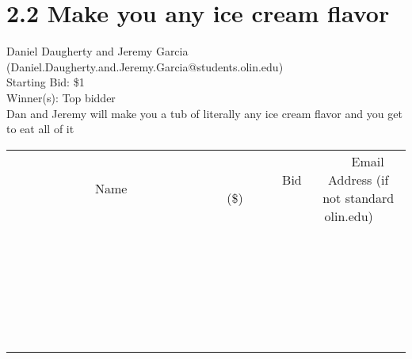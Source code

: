 \documentclass[11pt]{article}
\begin{document}
\section*{2.2 Make you any ice cream flavor}
Daniel Daugherty and Jeremy Garcia (Daniel.Daugherty.and.Jeremy.Garcia@students.olin.edu) \\
Starting Bid: \$1 \\
Winner(s): 
Top bidder \\
Dan and Jeremy will make you a tub of literally any ice cream flavor and you get to eat all of it \\[6ex]
\begin{tabular}{c c c}
~~~~~~~~~~~~~Name~~~~~~~~~~~~~ & ~~~~~~~~~Bid (\$)~~~~~~~~~ & ~~~Email Address (if not standard olin.edu)~~~ \\
 & & \\
\hline
 & & \\
\hline
 & & \\
\hline
 & & \\
\hline
 & & \\
\hline
 & & \\
\hline
 & & \\
\hline
 & & \\
\hline
 & & \\
\hline
 & & \\
\hline
 & & \\
\hline
 & & \\
\hline
 & & \\
\hline
 & & \\
\hline
 & & \\
\hline
 & & \\
\hline
 & & \\
\hline
 & & \\
\hline
 & & \\
\hline
 & & \\
\hline
 & & \\
\hline
 & & \\
\hline
 & & \\
\hline
 & & \\
\hline
 & & \\
\hline
 & & \\
\hline
\end{tabular}
\clearpage
\end{document}
